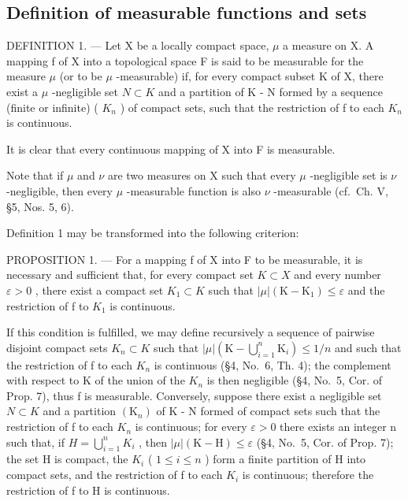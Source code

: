 \subsection{Definition of measurable functions and sets}

DEFINITION 1. --- Let X be a locally compact space, \(\mu\) a measure on X. A mapping f of X into a topological space F is said to be measurable for the measure \(\mu\) (or to be \(\mu\) -measurable) if, for every compact subset K of X, there exist a \(\mu\) -negligible set \(N \subset K\) and a partition of K - N formed by a sequence (finite or infinite) ( \(K_{n}\) ) of compact sets, such that the restriction of f to each \(K_{n}\) is continuous.

It is clear that every continuous mapping of X into F is measurable.

Note that if \(\mu\) and \(\nu\) are two measures on X such that every \(\mu\) -negligible set is \(\nu\) -negligible, then every \(\mu\) -measurable function is also \(\nu\) -measurable (cf.~Ch. V, §5, Nos. 5, 6).

Definition 1 may be transformed into the following criterion:

PROPOSITION 1. --- For a mapping f of X into F to be measurable, it is necessary and sufficient that, for every compact set \(K \subset X\) and every number \(\varepsilon > 0\) , there exist a compact set \(K_{1} \subset K\) such that \(|\mu|(\mathrm{K} - \mathrm{K}_{1}) \leqslant \varepsilon\) and the restriction of f to \(K_{1}\) is continuous.

If this condition is fulfilled, we may define recursively a sequence of pairwise disjoint compact sets \(K_{n} \subset K\) such that \(|\mu|(\mathrm{K} - \bigcup_{i=1}^{n} \mathrm{K}_{i}) \leqslant 1/n\) and such that the restriction of f to each \(K_{n}\) is continuous (§4, No.~6, Th. 4); the complement with respect to K of the union of the \(K_{n}\) is then negligible (§4, No.~5, Cor. of Prop. 7), thus f is measurable. Conversely, suppose there exist a negligible set \(N \subset K\) and a partition \((\mathrm{K}_{n})\) of K - N formed of compact sets such that the restriction of f to each \(K_{n}\) is continuous; for every \(\varepsilon > 0\) there exists an integer n such that, if \(H = \bigcup_{i=1}^{n} K_{i}\) , then \(|\mu|(\mathrm{K} - \mathrm{H}) \leqslant \varepsilon\) (§4, No.~5, Cor. of Prop. 7); the set H is compact, the \(K_{i}\) ( \(1 \leqslant i \leqslant n\) ) form a finite partition of H into compact sets, and the restriction of f to each \(K_{i}\) is continuous; therefore the restriction of f to H is continuous.


